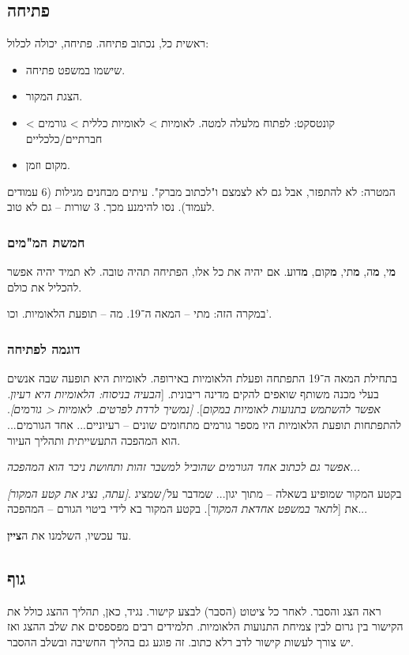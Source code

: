 \documentclass[]{article}
\begin{document}
	\subsection{פתיחה}
	ראשית כל, נכתוב פתיחה. פתיחה, יכולה לכלול: 
	\begin{itemize}
		\item שישמו במשפט פתיחה. 
		\item הצגת המקור. 
		\item קונטסקט: לפתוח מלעלה למטה. לאומיות > לאומיות כללית > גורמים > חברתיים/כלכליים 
		\item מקום וזמן. 
	\end{itemize}
	המטרה: לא להתפזר, אבל גם לא לצמצם ו"לכתוב מברק". עיתים מבחנים מגילות (6 עמודים לעמוד). נסו להימנע מכך. 3 שורות – גם לא טוב. 
	
	\subsubsection{חמשת המ"מים}
	\textbf{מ}י, \textbf{מ}ה, \textbf{מ}תי, \textbf{מ}קום, \textbf{מ}דוע. אם יהיה את כל אלו, הפתיחה תהיה טובה. 
	לא תמיד יהיה אפשר להכליל את כולם.
	
	במקרה הזה: 
	מתי – המאה ה־19. מה – תופעת הלאומיות. וכו'. 
	\subsubsection{דוגמה לפתיחה}
	בתחילת המאה ה־19 התפתחה ופעלת הלאומיות באירופה. לאומיות היא תופעה שבה אנשים בעלי מכנה משותף שואפים להקים מדינה ריבונית. [\textit{הבעיה בניסוח: הלאומיות היא רעיון. אפשר להשתמש בתנועות לאומיות במקום}]. 
	\textit{[נמשיך לרדת לפרטים. לאומיות < גורמים]}.  להתפתחות תופעת הלאומיות היו מספר גורמים מתחומים שונים – רעיוניים... אחד הגורמים... הוא המהפכה התעשייתית ותהליך העיור. 
	
	\textit{אפשר גם לכתוב אחד הגורמים שהוביל למשבר זהות ותחושת ניכר הוא המהפכה...}
	
	\textit{[עתה, נציג את קטע המקור]}. בקטע המקור שמופיע בשאלה – מתוך יגון... שמדבר על/שמציג את [\textit{לתאר במשפט אחדאת המקור}]. בקטע המקור בא לידי ביטוי הגורם – המהפכה...
	
	עד עכשיו, השלמנו את ה\textbf{ציין}. 
	
	\subsection{גוף}
	ראה הצג והסבר. לאחר כל ציטוט (הסבר) לבצע קישור. נגיד, כאן, תהליך ההצג כולל את הקישור בין גרום לבין צמיחת התנועות הלאומיות. תלמידים רבים מפספסים את שלב ההצג ואז יש צורך לעשות קישור לדב רלא כתוב. זה פוגע גם בהליך החשיבה ובשלב ההסבר. 
\end{document}

